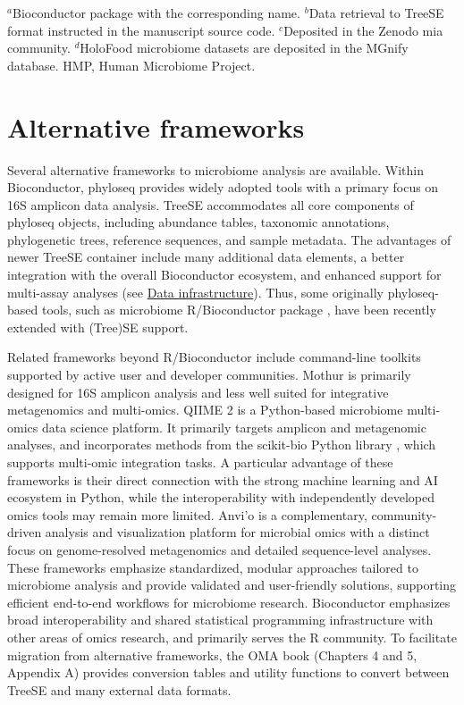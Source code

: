 \documentclass[
  sn-nature,
]{sn-jnl}
\begin{document}
\(^a\)Bioconductor package with the corresponding name. \(^b\)Data
retrieval to TreeSE format instructed in the manuscript source code.
\(^c\)Deposited in the Zenodo mia community. \(^d\)HoloFood microbiome
datasets are deposited in the MGnify database. HMP, Human Microbiome
Project.

\section{Alternative frameworks}\label{sec-data_frameworks}

Several alternative frameworks to microbiome analysis are available.
Within Bioconductor, phyloseq \citep{mcmurdie2012} provides widely
adopted tools with a primary focus on 16S amplicon data analysis. TreeSE
accommodates all core components of phyloseq objects, including
abundance tables, taxonomic annotations, phylogenetic trees, reference
sequences, and sample metadata. The advantages of newer TreeSE container
\citep{huber2015} include many additional data elements, a better
integration with the overall Bioconductor ecosystem, and enhanced
support for multi-assay analyses (see \hyperref[sec-infra]{Data
infrastructure}). Thus, some originally phyloseq-based tools, such as
microbiome R/Bioconductor package \citep{shetty2019}, have been recently
extended with (Tree)SE support.

Related frameworks beyond R/Bioconductor include command-line toolkits
supported by active user and developer communities. Mothur
\citep{schloss2009} is primarily designed for 16S amplicon analysis and
less well suited for integrative metagenomics and multi-omics. QIIME 2
\citep{bolyen2019} is a Python-based microbiome multi-omics data science
platform. It primarily targets amplicon and metagenomic analyses, and
incorporates methods from the scikit-bio Python library
\citep{aton2026}, which supports multi-omic integration tasks. A
particular advantage of these frameworks is their direct connection with
the strong machine learning and AI ecosystem in Python, while the
interoperability with independently developed omics tools may remain
more limited. Anvi'o \citep{eren2021} is a complementary,
community-driven analysis and visualization platform for microbial omics
with a distinct focus on genome-resolved metagenomics and detailed
sequence-level analyses. These frameworks emphasize standardized,
modular approaches tailored to microbiome analysis and provide validated
and user-friendly solutions, supporting efficient end-to-end workflows
for microbiome research. Bioconductor emphasizes broad interoperability
and shared statistical programming infrastructure with other areas of
omics research, and primarily serves the R community. To facilitate
migration from alternative frameworks, the OMA book (Chapters 4 and 5,
Appendix A) provides conversion tables and utility functions to convert
between TreeSE and many external data formats.
\end{document}
